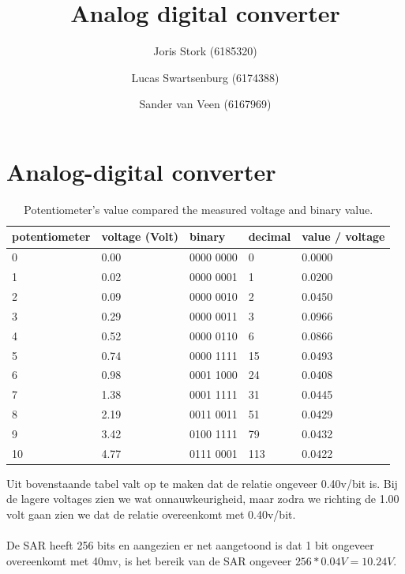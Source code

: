 \documentclass[10pt,a4paper]{article}
\title{Analog digital converter}
\author{Joris Stork (6185320) \and Lucas Swartsenburg (6174388) \and Sander van
Veen (6167969)}
\begin{document}
\maketitle
\tableofcontents

\pagebreak

\section{Analog-digital converter} %
\label{sec:Analog-digital converter}

\begin{table}[H]
\centering
\begin{tabular}{|l|l|l|l|l|} \hline
potentiometer & voltage (Volt) & binary    & decimal & value / voltage\\ \hline
 0            & 0.00           & 0000 0000 & 0       & 0.0000         \\ \hline
 1            & 0.02           & 0000 0001 & 1       & 0.0200         \\ \hline
 2            & 0.09           & 0000 0010 & 2       & 0.0450         \\ \hline
 3            & 0.29           & 0000 0011 & 3       & 0.0966         \\ \hline
 4            & 0.52           & 0000 0110 & 6       & 0.0866         \\ \hline
 5            & 0.74           & 0000 1111 & 15      & 0.0493         \\ \hline
 6            & 0.98           & 0001 1000 & 24      & 0.0408         \\ \hline
 7            & 1.38           & 0001 1111 & 31      & 0.0445         \\ \hline
 8            & 2.19           & 0011 0011 & 51      & 0.0429         \\ \hline
 9            & 3.42           & 0100 1111 & 79      & 0.0432         \\ \hline
10            & 4.77           & 0111 0001 & 113     & 0.0422         \\ \hline
\end{tabular}
\caption{Potentiometer's value compared the measured voltage and binary value.}
\end{table}

Uit bovenstaande tabel valt op te maken dat de relatie ongeveer 0.40v/bit is.
Bij de lagere voltages zien we wat onnauwkeurigheid, maar zodra we richting
de 1.00 volt gaan zien we dat de relatie overeenkomt met 0.40v/bit.\\
\\
De SAR heeft 256 bits en aangezien er net aangetoond is dat 1 bit ongeveer
overeenkomt met 40mv, is het bereik van de SAR ongeveer $256 * 0.04V = 10.24
 V$.
\end{document}
